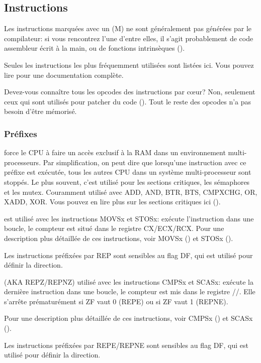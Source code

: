 \subsection{Instructions}
\label{sec:x86_instructions}

Les instructions marquées avec un (M) ne sont généralement pas générées par le compilateur:
si vous rencontrez l'une d'entre elles, il s'agit probablement de code assembleur
écrit à la main, ou de fonctions intrinsèques ().


Seules les instructions les plus fréquemment utilisées sont listées ici.
Vous pouvez lire  pour une documentation complète.

Devez-vous connaître tous les opcodes des instructions par c\oe{}ur?
Non, seulement ceux qui sont utilisés pour patcher du code
().
Tout le reste des opcodes n'a pas besoin d'être mémorisé.

\subsubsection{Préfixes}

\begin{description}
\label{x86_lock}
\item[LOCK] force le CPU à faire un accès exclusif à la RAM dans un environnement multi-processeurs.
Par simplification, on peut dire que lorsqu'une instruction avec ce préfixe est exécutée,
tous les autres CPU dans un système multi-processeur sont stoppés.
Le plus souvent, c'est utilisé pour les sections critiques, les sémaphores et les mutex.
Couramment utilisé avec ADD, AND, BTR, BTS, CMPXCHG, OR, XADD, XOR.
Vous pouvez en lire plus sur les sections critiques ici ().

\item[REP] est utilisé avec les instructions MOVSx et STOSx:
exécute l'instruction dans une boucle, le compteur est situé dans le registre CX/ECX/RCX.
Pour une description plus détaillée de ces instructions, voir MOVSx ()
et STOSx ().

Les instructions préfixées par REP sont sensibles au flag DF, qui est utilisé pour définir la direction.

\item[REPE/REPNE] (\ac{AKA} REPZ/REPNZ) utilisé avec les instructions CMPSx et SCASx:
exécute la dernière instruction dans une boucle, le compteur est mis dans le registre //.
Elle s'arrête prématurément si ZF vaut 0 (REPE) ou si ZF vaut 1 (REPNE).

Pour une description plus détaillée de ces instructions, voir CMPSx ()
et SCASx ().

Les instructions préfixées par REPE/REPNE sont sensibles au flag DF, qui est utilisé pour définir la direction.

\end{description}

